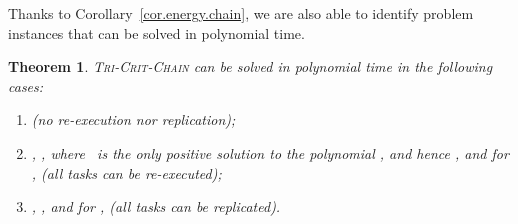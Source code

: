 \documentclass[a4paper]{article}
\theoremstyle{plain}
\newtheorem{theorem}{Theorem}
\theoremstyle{definition}
\theoremstyle{remark}
\newcommand{\chain}{\textsc{Tri-Crit-Chain}\xspace}
\begin{document}
Thanks to Corollary~\ref{cor.energy.chain}, we are also able to identify
problem instances that can be solved in polynomial time. 


\begin{theorem}
  \label{thm.chain}
 \chain can be solved in polynomial time in the
 following cases: 
\begin{enumerate}
    \item  (no re-execution nor replication);
    \item , , where ~is the 
      only positive
      solution to the polynomial , and
      hence , and 
      for ,  (all
      tasks can be re-executed);
\item , , and 
      for ,  (all tasks can
      be replicated).
\end{enumerate}
\end{theorem}
\end{document}
